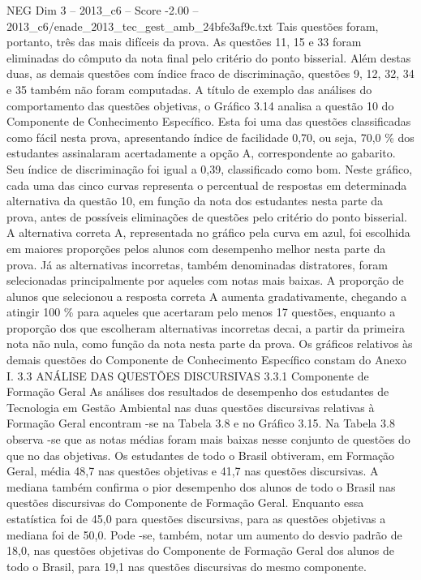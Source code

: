 \begin{textsample}{NEG Dim 3 – 2013\_c6 – Score -2.00 – 2013\_c6/enade\_2013\_tec\_gest\_amb\_24bfe3af9c.txt}
Tais questões foram, portanto, três das mais difíceis da prova.
As questões 11, 15 e 33 foram eliminadas do cômputo da nota final pelo critério do ponto bisserial.
Além destas duas, as demais questões com índice fraco de discriminação, questões 9, 12, 32, 34 e 35 também não foram computadas.
A título de exemplo das análises do comportamento das questões objetivas, o Gráfico 3.14 analisa a questão 10 do Componente de Conhecimento Específico.
Esta foi uma das questões classificadas como fácil nesta prova, apresentando índice de facilidade 0,70, ou seja, 70,0 \% dos estudantes assinalaram acertadamente a opção A, correspondente ao gabarito.
Seu índice de discriminação foi igual a 0,39, classificado como bom.
Neste gráfico, cada uma das cinco curvas representa o percentual de respostas em determinada alternativa da questão 10, em função da nota dos estudantes nesta parte da prova, antes de possíveis eliminações de questões pelo critério do ponto bisserial.
A alternativa correta A, representada no gráfico pela curva em azul, foi escolhida em maiores proporções pelos alunos com desempenho melhor nesta parte da prova.
Já as alternativas incorretas, também denominadas distratores, foram selecionadas principalmente por aqueles com notas mais baixas.
A proporção de alunos que selecionou a resposta correta A aumenta gradativamente, chegando a atingir 100 \% para aqueles que acertaram pelo menos 17 questões, enquanto a proporção dos que escolheram alternativas incorretas decai, a partir da primeira nota não nula, como função da nota nesta parte da prova.
Os gráficos relativos às demais questões do Componente de Conhecimento Específico constam do Anexo I. 3.3 ANÁLISE DAS QUESTÕES DISCURSIVAS 3.3.1 Componente de Formação Geral As análises dos resultados de desempenho dos estudantes de Tecnologia em Gestão Ambiental nas duas questões discursivas relativas à Formação Geral encontram -se na Tabela 3.8 e no Gráfico 3.15.
Na Tabela 3.8 observa -se que as notas médias foram mais baixas nesse conjunto de questões do que no das objetivas.
Os estudantes de todo o Brasil obtiveram, em Formação Geral, média 48,7 nas questões objetivas e 41,7 nas questões discursivas.
A mediana também confirma o pior desempenho dos alunos de todo o Brasil nas questões discursivas do Componente de Formação Geral.
Enquanto essa estatística foi de 45,0 para questões discursivas, para as questões objetivas a mediana foi de 50,0.
Pode -se, também, notar um aumento do desvio padrão de 18,0, nas questões objetivas do Componente de Formação Geral dos alunos de todo o Brasil, para 19,1 nas questões discursivas do mesmo componente.

\end{textsample}
